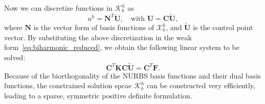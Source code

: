 \documentclass[preprint,12pt]{elsarticle}
\begin{document}
Now we can discretize functions in $\mathcal{K}_b^h$ as
\begin{equation}
    u^h=\mathbf{N}^T\mathbf{U},\quad\text{with }\mathbf{U}=\mathbf{C}\tilde{\mathbf{U}},
\end{equation}
where $\mathbf{N}$ is the vector form of basis functions of $\mathcal{X}_b^h$, and $\tilde{\mathbf{U}}$ is the control point vector. By substituting the above discretization in the weak form~\eqref{eq:biharmonic_reduced}, we obtain the following linear system to be solved:
\begin{equation}
    \mathbf{C}^T\mathbf{K}\mathbf{C}\tilde{\mathbf{U}}=\mathbf{C}^T\mathbf{F}.
\end{equation}
Because of the biorthogonality of the NURBS basis functions and their dual basis functions, the constrained solution spcae $\mathcal{K}_b^h$ can be constructed very efficiently, leading to a sparse, symmetric positive definite formulation.
\end{document}
